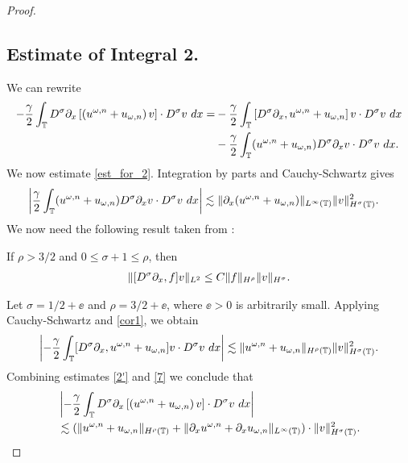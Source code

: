 \begin{proof}
\subsection*{Estimate of Integral 2.} We can rewrite
%
%
\begin{equation}
\begin{split}
-\frac{\gamma}{2} \int_{\mathbb{T}} D^\sigma \partial_x \left[ \left( u^{\omega,n} + 
u_{\omega,n}
\right)v \right] \cdot D^\sigma v \ dx
= & -\frac{\gamma}{2}\int_{\mathbb{T}} \left[ D^\sigma \partial_x , u^{\omega,n} + 
u_{\omega,n}
\right]v \cdot D^\sigma v \ dx
\\
& - \frac{\gamma}{2} \int_{\mathbb{T}} (u^{\omega,n} + u_{\omega,n})
D^\sigma \partial_x v \cdot
D^\sigma v \ dx.
\label{est_for_2}
\end{split}
\end{equation}
%
%
We now estimate \eqref{est_for_2}. Integration 
by parts and Cauchy-Schwartz gives 
%
%
\begin{equation}
\begin{split}
\left | \frac{\gamma}{2} \int_{\mathbb{T}} (u^{\omega,n} + u_{\omega,n})
D^\sigma \partial_x v \cdot
D^\sigma v \ dx \right |
& \lesssim \|\partial_x(u^{\omega,n} + u_{\omega,n}) \|_{L^\infty(\mathbb{T})}
\|v\|_{H^\sigma(\mathbb{T})}^2.
\label{2'}
\end{split}
\end{equation}
%
%
We now need the following result
taken from \cite{Himonas_2009_Non-uniform-dep-per}:
%
\begin{lemma}
\label{cor1}
If $\rho > 3/2$ and $0 \le \sigma + 1 \le \rho$, then
%
%
\begin{equation}
\begin{split}
\|[D^\sigma \partial_x ,f]v\|_{L^2} \le C \|f\|_{H^\rho} \|v\|_{H^\sigma}.
\label{15}
\end{split}
\end{equation}
%
%
\end{lemma}
%
Let $\sigma = 1/2 + \ee$ and $\rho = 3/2 + \ee$, where 
$\ee > 0$ is
arbitrarily small. Applying Cauchy-Schwartz and \cref{cor1}, we obtain 
%
%
%
%
%
\begin{equation}
\begin{split}
\left | -\frac{\gamma}{2} \int_{\mathbb{T}} [D^\sigma \partial_x , u^{\omega,n} + 
u_{\omega,n}]v
\cdot D^\sigma v \ dx \right | \lesssim \|u^{\omega,n} +
u_{\omega,n}\|_{H^{\rho}(\mathbb{T})} \|v\|_{H^\sigma(\mathbb{T})}^2.
\label{7}
\end{split}
\end{equation}
%
%
Combining estimates \eqref{2'} and \eqref{7} we conclude that
%
%
\begin{equation}
\begin{split}
& \left | -\frac{\gamma}{2} \int_{\mathbb{T}} D^\sigma \partial_x \left[ \left( 
u^{\omega,n} + u_{\omega,n}
\right)v \right]  \cdot D^\sigma v \ dx \right |
\\
& \lesssim (\|u^{\omega,n} + u_{\omega,n}\|_{H^{\rho}(\mathbb{T})} + \|\partial_x 
u^{\omega,n} +
\partial_x u_{\omega,n}\|_{L^\infty(\mathbb{T})} ) \cdot \|v\|_{H^\sigma(\mathbb{T})}^2.
\label{8}
\end{split}
\end{equation}
%
%
%


\end{proof}
